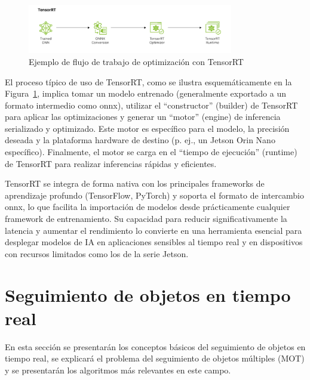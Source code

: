 \documentclass[11pt,spanish,listoffigures,listoftables]{tfgetsinf}
\begin{document}
\begin{figure}[H]
   \centering
   \includegraphics[width=0.8\textwidth]{images/estado_del_arte/TensorRT_pipeline.png}
   \caption[Ejemplo de flujo de trabajo de optimización con TensorRT]{Ejemplo de flujo de trabajo de optimización con TensorRT}
   \label{fig:tensorrt_architecture}
\end{figure}

El proceso típico de uso de TensorRT, como se ilustra esquemáticamente en la Figura~\ref{fig:tensorrt_architecture}, implica tomar un modelo entrenado (generalmente exportado a un formato intermedio como \gls{onnx}), utilizar el ``constructor'' (builder) de TensorRT para aplicar las optimizaciones y generar un ``motor'' (engine) de inferencia serializado y optimizado. Este motor es específico para el modelo, la precisión deseada y la plataforma hardware de destino (p. ej., un Jetson Orin Nano específico). Finalmente, el motor se carga en el ``tiempo de ejecución'' (runtime) de TensorRT para realizar inferencias rápidas y eficientes.

TensorRT se integra de forma nativa con los principales frameworks de aprendizaje profundo (TensorFlow, PyTorch) y soporta el formato de intercambio \gls{onnx}, lo que facilita la importación de modelos desde prácticamente cualquier framework de entrenamiento. Su capacidad para reducir significativamente la latencia y aumentar el rendimiento lo convierte en una herramienta esencial para desplegar modelos de IA en aplicaciones sensibles al tiempo real y en dispositivos con recursos limitados como los de la serie Jetson.



\section{Seguimiento de objetos en tiempo real} \label{sec:mot}
En esta sección se presentarán los conceptos básicos del seguimiento de objetos en tiempo real, se explicará el problema del seguimiento de objetos múltiples (MOT) y se presentarán los algoritmos más relevantes en este campo.
\end{document}
